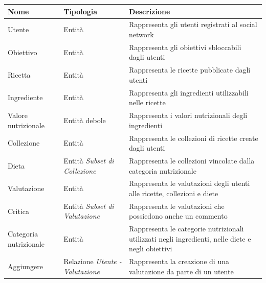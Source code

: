 ﻿\documentclass[a4paper,12pt]{report}
\begin{document}
\begin{table}[h!]
    \centering
    \begin{tabular}{ |p{1.2in}|p{1.2in}|p{2.4in}| }
        \hline
        \scriptsize{\textbf{Nome}} & \scriptsize{\textbf{Tipologia}} & \scriptsize{\textbf{Descrizione}} \\
        \hline
        \scriptsize{Utente} & \scriptsize{Entità} & \scriptsize{Rappresenta gli utenti registrati al social network} \\
        \hline
        \scriptsize{Obiettivo} & \scriptsize{Entità} & \scriptsize{Rappresenta gli obiettivi sbloccabili dagli utenti} \\
        \hline
        \scriptsize{Ricetta} & \scriptsize{Entità} & \scriptsize{Rappresenta le ricette pubblicate dagli utenti} \\
        \hline
        \scriptsize{Ingrediente} & \scriptsize{Entità} & \scriptsize{Rappresenta gli ingredienti utilizzabili nelle ricette} \\
        \hline
        \scriptsize{Valore nutrizionale} & \scriptsize{Entità debole} & \scriptsize{Rappresenta i valori nutrizionali degli ingredienti} \\
        \hline
        \scriptsize{Collezione} & \scriptsize{Entità} & \scriptsize{Rappresenta le collezioni di ricette create dagli utenti} \\
        \hline
        \scriptsize{Dieta} & \scriptsize{Entità \newline \textit{Subset di Collezione}} & \scriptsize{Rappresenta le collezioni vincolate dalla categoria nutrizionale} \\
        \hline
        \scriptsize{Valutazione} & \scriptsize{Entità} & \scriptsize{Rappresenta le valutazioni degli utenti alle ricette, collezioni e diete} \\
        \hline
        \scriptsize{Critica} & \scriptsize{Entità \newline \textit{Subset di Valutazione}} & \scriptsize{Rappresenta le valutazioni che possiedono anche un commento} \\
        \hline
        \scriptsize{Categoria nutrizionale} & \scriptsize{Entità} & \scriptsize{Rappresenta le categorie nutrizionali utilizzati negli ingredienti, nelle diete e negli obiettivi} \\
        \hline
        \scriptsize{Aggiungere} & \scriptsize{Relazione \newline \textit{Utente - Valutazione}} & \scriptsize{Rappresenta la creazione di una valutazione da parte di un utente} \\

\end{tabular}
\end{table}
\end{document}

